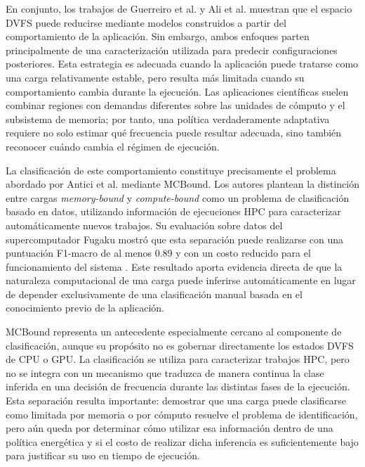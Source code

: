 En conjunto, los trabajos de Guerreiro et al. \cite{Guerreiro2019} y Ali et al. \cite{Ali2023} muestran que el espacio DVFS puede reducirse mediante modelos construidos a partir del comportamiento de la aplicación. Sin embargo, ambos enfoques parten principalmente de una caracterización utilizada para predecir configuraciones posteriores. Esta estrategia es adecuada cuando la aplicación puede tratarse como una carga relativamente estable, pero resulta más limitada cuando su comportamiento cambia durante la ejecución. Las aplicaciones científicas suelen combinar regiones con demandas diferentes sobre las unidades de cómputo y el subsistema de memoria; por tanto, una política verdaderamente adaptativa requiere no solo estimar qué frecuencia puede resultar adecuada, sino también reconocer cuándo cambia el régimen de ejecución.

La clasificación de este comportamiento constituye precisamente el problema abordado por Antici et al. \cite{Antici2024} mediante MCBound. Los autores plantean la distinción entre cargas \textit{memory-bound} y \textit{compute-bound} como un problema de clasificación basado en datos, utilizando información de ejecuciones HPC para caracterizar automáticamente nuevos trabajos. Su evaluación sobre datos del supercomputador Fugaku mostró que esta separación puede realizarse con una puntuación F1-macro de al menos 0.89 y con un costo reducido para el funcionamiento del sistema \cite{Antici2024}. Este resultado aporta evidencia directa de que la naturaleza computacional de una carga puede inferirse automáticamente en lugar de depender exclusivamente de una clasificación manual basada en el conocimiento previo de la aplicación.

MCBound representa un antecedente especialmente cercano al componente de clasificación, aunque su propósito no es gobernar directamente los estados DVFS de CPU o GPU. La clasificación se utiliza para caracterizar trabajos HPC, pero no se integra con un mecanismo que traduzca de manera continua la clase inferida en una decisión de frecuencia durante las distintas fases de la ejecución. Esta separación resulta importante: demostrar que una carga puede clasificarse como limitada por memoria o por cómputo resuelve el problema de identificación, pero aún queda por determinar cómo utilizar esa información dentro de una política energética y si el costo de realizar dicha inferencia es suficientemente bajo para justificar su uso en tiempo de ejecución.

